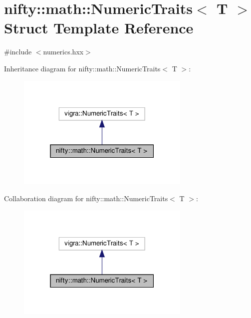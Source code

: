 \hypertarget{structnifty_1_1math_1_1NumericTraits}{}\section{nifty\+:\+:math\+:\+:Numeric\+Traits$<$ T $>$ Struct Template Reference}
\label{structnifty_1_1math_1_1NumericTraits}


{\ttfamily \#include $<$numerics.\+hxx$>$}



Inheritance diagram for nifty\+:\+:math\+:\+:Numeric\+Traits$<$ T $>$\+:
\nopagebreak
\begin{figure}[H]
\begin{center}
\leavevmode
\includegraphics[width=235pt]{structnifty_1_1math_1_1NumericTraits__inherit__graph}
\end{center}
\end{figure}


Collaboration diagram for nifty\+:\+:math\+:\+:Numeric\+Traits$<$ T $>$\+:
\nopagebreak
\begin{figure}[H]
\begin{center}
\leavevmode
\includegraphics[width=235pt]{structnifty_1_1math_1_1NumericTraits__coll__graph}
\end{center}
\end{figure}
